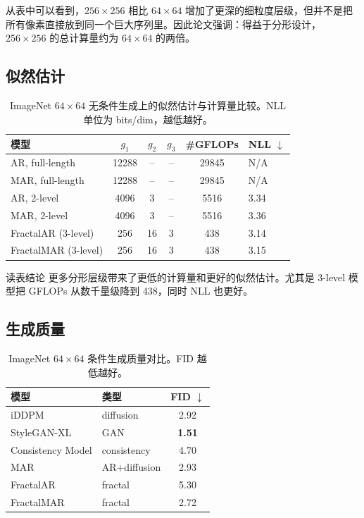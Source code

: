 \documentclass[UTF8,11pt,a4paper]{ctexart}
\begin{document}
从表中可以看到，$256\times256$ 相比 $64\times64$ 增加了更深的细粒度层级，但并不是把所有像素直接放到同一个巨大序列里。因此论文强调：得益于分形设计，$256\times256$ 的总计算量约为 $64\times64$ 的两倍。

\subsection{似然估计}

\begin{table}[H]
\centering
\small
\caption{ImageNet $64\times64$ 无条件生成上的似然估计与计算量比较。NLL 单位为 bits/dim，越低越好。}
\begin{tabular}{lccccl}
\toprule
模型 & $g_1$ & $g_2$ & $g_3$ & \#GFLOPs & NLL $\downarrow$\\
\midrule
AR, full-length & 12288 & -- & -- & 29845 & N/A\\
MAR, full-length & 12288 & -- & -- & 29845 & N/A\\
AR, 2-level & 4096 & 3 & -- & 5516 & 3.34\\
MAR, 2-level & 4096 & 3 & -- & 5516 & 3.36\\
FractalAR (3-level) & 256 & 16 & 3 & 438 & 3.14\\
FractalMAR (3-level) & 256 & 16 & 3 & 438 & 3.15\\
\bottomrule
\end{tabular}
\end{table}

\begin{notebox}{读表结论}
更多分形层级带来了更低的计算量和更好的似然估计。尤其是 3-level 模型把 GFLOPs 从数千量级降到 438，同时 NLL 也更好。
\end{notebox}

\subsection{生成质量}

\begin{table}[H]
\centering
\small
\caption{ImageNet $64\times64$ 条件生成质量对比。FID 越低越好。}
\begin{tabular}{llc}
\toprule
模型 & 类型 & FID $\downarrow$\\
\midrule
iDDPM & diffusion & 2.92\\
StyleGAN-XL & GAN & \textbf{1.51}\\
Consistency Model & consistency & 4.70\\
MAR & AR+diffusion & 2.93\\
\midrule
FractalAR & fractal & 5.30\\
FractalMAR & fractal & 2.72\\
\bottomrule
\end{tabular}
\end{table}
\end{document}
